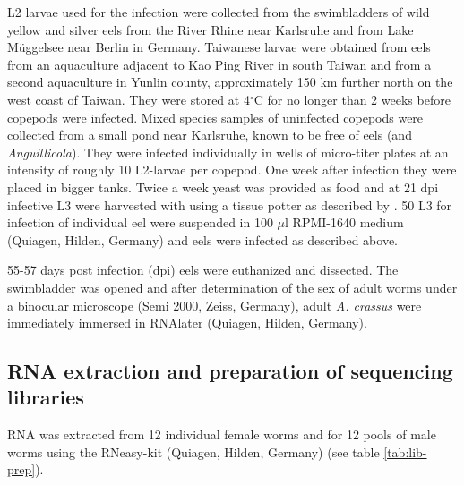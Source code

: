 L2 larvae used for the infection were collected from the swimbladders
of wild yellow and silver eels from the River Rhine near Karlsruhe and
from Lake M\"uggelsee near Berlin in Germany. Taiwanese larvae were
obtained from eels from an aquaculture adjacent to Kao Ping River in
south Taiwan and from a second aquaculture in Yunlin county,
approximately 150 km further north on the west coast of Taiwan. They
were stored at 4$^{\circ}$C for no longer than 2 weeks before copepods
were infected. Mixed species samples of uninfected copepods were
collected from a small pond near Karlsruhe, known to be free of eels
(and \textit{Anguillicola}). They were infected individually in wells
of micro-titer plates at an intensity of roughly 10 L2-larvae per
copepod. One week after infection they were placed in bigger
tanks. Twice a week yeast was provided as food and at 21 dpi infective
L3 were harvested with using a tissue potter as described by
\cite{haenen_improved_1994}. 50 L3 for infection of individual eel
were suspended in 100 $\mu$l RPMI-1640 medium (Quiagen, Hilden,
Germany) and eels were infected as described above.

55-57 days post infection (dpi) eels were euthanized and dissected.
The swimbladder was opened and after determination of the sex of adult
worms under a binocular microscope (Semi 2000, Zeiss, Germany), adult
\textit{A. crassus} were immediately immersed in RNAlater (Quiagen,
Hilden, Germany).

\subsection{RNA extraction and preparation of sequencing libraries}

RNA was extracted from 12 individual female worms and for 12 pools of
male worms using the RNeasy-kit (Quiagen, Hilden, Germany) (see table
\ref{tab:lib-prep}).

